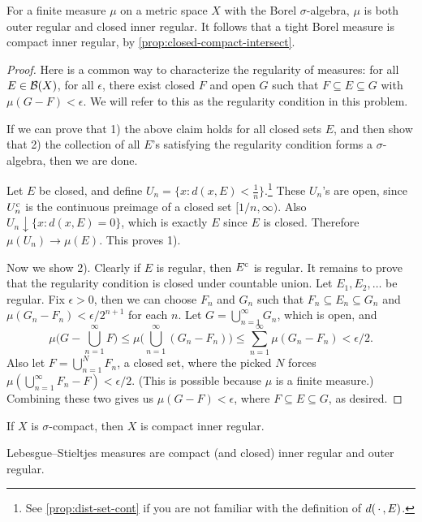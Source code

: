 \begin{thm}
    For a finite measure $\mu$ on a metric space $X$ with the Borel $\sigma$-algebra, $\mu$ is both outer regular and closed inner regular. It follows that a tight Borel measure is compact inner regular, by \cref{prop:closed-compact-intersect}.
\end{thm}
\begin{proof}
    Here is a common way to characterize the regularity of measures: for all $E\in \mathcal{B}(X)$, for all $\epsilon$, there exist closed $F$ and open $G$ such that $F\subseteq E \subseteq G$ with $\mu(G - F) < \epsilon$. We will refer to this as the regularity condition in this problem.

    If we can prove that 1) the above claim holds for all closed sets $E$, and then show that 2) the collection of all $E$'s satisfying the regularity condition forms a $\sigma$-algebra, then we are done.

    Let $E$ be closed, and define $U_n = \{x : d(x,E) < \frac{1}{n}\}$.\footnote{See \cref{prop:dist-set-cont} if you are not familiar with the definition of $d(\,\cdot\,,E)$.} These $U_n$'s are open, since $U_n^{\mathrm{c}}$ is the continuous preimage of a closed set $[1/n,\infty)$. Also $U_n \downarrow \{x : d(x,E) = 0 \}$, which is exactly $E$ since $E$ is closed. Therefore $\mu(U_n) \to \mu(E)$. This proves 1).

    Now we show 2). Clearly if $E$ is regular, then $E^{\mathrm{c}}$ is regular. It remains to prove that the regularity condition is closed under countable union. Let $E_1,E_2,\dotsc$ be regular. Fix $\epsilon > 0$, then we can choose $F_n$ and $G_n$ such that $F_n \subseteq E_n \subseteq G_n$ and $\mu(G_n - F_n) < \epsilon/2^{n+1}$ for each $n$. Let $G = \bigcup_{n=1}^\infty G_n$, which is open, and \[\mu\biggl(G - \bigcup_{n=1}^\infty F\biggr) \leq \mu\biggl(\bigcup_{n=1}^\infty (G_n - F_n)\biggr) \leq \sum_{n=1}^\infty \mu(G_n -F_n) < \epsilon / 2.\] Also let $F = \bigcup_{n=1}^N F_n$, a closed set, where the picked $N$ forces $\mu(\bigcup_{n=1}^\infty F_n - F) < \epsilon/2$. (This is possible because $\mu$ is a finite measure.) Combining these two gives us $\mu(G - F) < \epsilon$, where $F \subseteq E \subseteq G$, as desired.
\end{proof}

If $X$ is $\sigma$-compact, then $X$ is compact inner regular.

\begin{thm}
    Lebesgue--Stieltjes measures are compact (and closed) inner regular and outer regular.
\end{thm}

